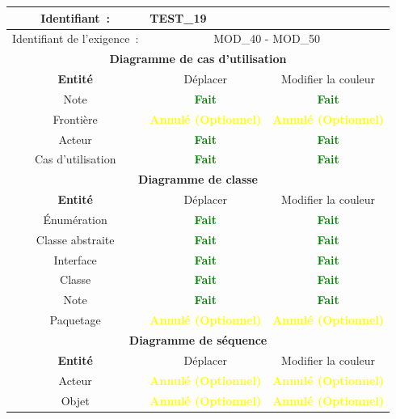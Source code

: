 \documentclass[hidelinks, a4paper,11pt,twoside,final]{article}
\begin{document}
    \begin{tabular}{|c|c|c|}\hline
    {Identifiant~:} & \multicolumn{2}{|l|}{TEST\_19} \\\hline
    {Identifiant de l’exigence~:} & \multicolumn{2}{|p{10cm}|}{MOD\_40 - MOD\_50} \\\hline
    \multicolumn{3}{|c|}{\textbf{Diagramme de cas d’utilisation}} \\\hline
    {\textbf{Entité}} & {Déplacer} & {Modifier la couleur} \\\hline
    {Note} & {\textcolor{green}{\textbf{Fait}}} & {\textcolor{green}{\textbf{Fait}}}\\\hline
    {Frontière} & {\textcolor{yellow}{\textbf{Annulé (Optionnel)}}} & {\textcolor{yellow}{\textbf{Annulé (Optionnel)}}}\\\hline
    {Acteur} & {\textcolor{green}{\textbf{Fait}}} & {\textcolor{green}{\textbf{Fait}}}\\\hline
    {Cas d’utilisation} & {\textcolor{green}{\textbf{Fait}}} & {\textcolor{green}{\textbf{Fait}}}\\\hline
    \multicolumn{3}{|c|}{\textbf{Diagramme de classe}} \\\hline
    {\textbf{Entité}} & {Déplacer} & {Modifier la couleur} \\\hline
    {Énumération} & {\textcolor{green}{\textbf{Fait}}} & {\textcolor{green}{\textbf{Fait}}}\\\hline
    {Classe abstraite} & {\textcolor{green}{\textbf{Fait}}} & {\textcolor{green}{\textbf{Fait}}}\\\hline
    {Interface} & {\textcolor{green}{\textbf{Fait}}} & {\textcolor{green}{\textbf{Fait}}}\\\hline
    {Classe} & {\textcolor{green}{\textbf{Fait}}} & {\textcolor{green}{\textbf{Fait}}} \\\hline
    {Note} & {\textcolor{green}{\textbf{Fait}}} & {\textcolor{green}{\textbf{Fait}}}\\\hline
    {Paquetage} & {\textcolor{yellow}{\textbf{Annulé (Optionnel)}}} & {\textcolor{yellow}{\textbf{Annulé (Optionnel)}}}\\\hline
    \multicolumn{3}{|c|}{\textbf{Diagramme de séquence}} \\\hline
    {\textbf{Entité}} & {Déplacer} & {Modifier la couleur} \\\hline
    {Acteur} & {\textcolor{yellow}{\textbf{Annulé (Optionnel)}}} & {\textcolor{yellow}{\textbf{Annulé (Optionnel)}}} \\\hline
    {Objet} & {\textcolor{yellow}{\textbf{Annulé (Optionnel)}}} & {\textcolor{yellow}{\textbf{Annulé (Optionnel)}}} \\\hline

\end{tabular}
\end{document}
